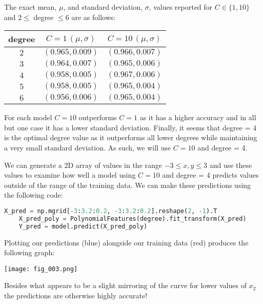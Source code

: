 \documentclass[12pt]{article}
\begin{document}
The exact mean, $\mu$, and standard deviation, $\sigma$, values reported for $C \in \{1, 10\}$ and $2 \le$ degree $\le 6$ are as follows:

\begin{center}
    \begin{tabular}{|c|c|c|}
        \hline
        degree & $C = 1 \, (\mu, \sigma)$ & $C = 10 \, (\mu, \sigma)$ \\
        \hline
        $2$ &  $(0.965, 0.009)$ & $(0.966, 0.007)$ \\
        $3$ &  $(0.964, 0.007)$ & $(0.965, 0.006)$ \\
        $4$ &  $(0.958, 0.005)$ & $(0.967, 0.006)$ \\
        $5$ &  $(0.958, 0.005)$ & $(0.965, 0.004)$ \\
        $6$ &  $(0.956, 0.006)$ & $(0.965, 0.004)$ \\ \hline
    \end{tabular}
\end{center}

For each model $C = 10$ outperforms $C = 1$ as it has a higher accuracy and in all but one case it has a lower standard deviation. Finally, it seems that degree = 4 is the optimal degree value as it outperforms all lower degrees while maintaining a very small standard deviation. As such, we will use $C = 10$ and degree = 4.

We can generate a 2D array of values in the range $-3 \le x, y \le 3$ and use these values to examine how well a model using $C = 10$ and degree = 4 predicts values outside of the range of the training data. We can make these predictions using the following code:

\begin{center}
    \lstset{basicstyle=\footnotesize}
    \begin{lstlisting}[language=Python]
    X_pred = np.mgrid[-3:3.2:0.2, -3:3.2:0.2].reshape(2, -1).T
    X_pred_poly = PolynomialFeatures(degree).fit_transform(X_pred)
    Y_pred = model.predict(X_pred_poly)
    \end{lstlisting}
\end{center}

Plotting our predictions (blue) alongside our training data (red) produces the following graph:

\begin{center}
    \texttt{[image: fig\_003.png]}
\end{center}

Besides what appears to be a slight mirroring of the curve for lower values of $x_2$ the predictions are otherwise highly accurate!
\end{document}
